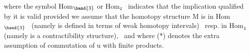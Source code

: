 where the symbol Hom$_{\hand{3}}$ or Hom$_4$ \ indicates that the implication qualified by
it is valid provided we assume that the homotopy structure  M is in
Hom$_{\hand{3}}$ \ (namely is defined in terms of weak homotopy intervals) \ resp. in
Hom$_4$ (namely is a contractibility structure), \ and where (*) denotes the
extra assumption of commutation of u with finite products.

